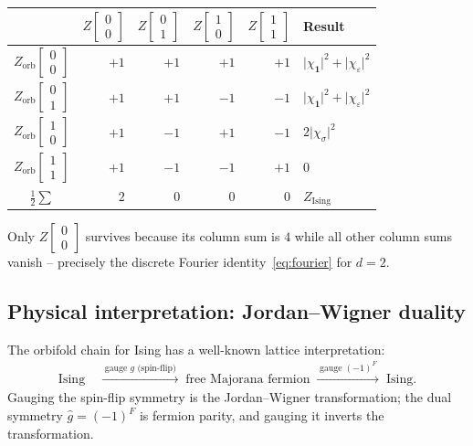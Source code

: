 \documentclass[11pt,a4paper]{article}
\theoremstyle{plain}
\theoremstyle{definition}
\theoremstyle{remark}
\newcommand{\partfn}[2]{Z\!\begin{bmatrix}#1\\#2\end{bmatrix}}
\newcommand{\abs}[1]{\lvert #1 \rvert}
\begin{document}
\medskip
\begin{center}
\renewcommand{\arraystretch}{1.5}
\begin{tabular}{c|rrrr|l}
  \toprule
  & $\partfn{0}{0}$ & $\partfn{0}{1}$ & $\partfn{1}{0}$ & $\partfn{1}{1}$
  & Result \\
  \midrule
  $Z_{\mathrm{orb}}\!\begin{bmatrix}0\\0\end{bmatrix}$
  & $+1$ & $+1$ & $+1$ & $+1$ & $\abs{\chi_{\mathbf{1}}}^2+\abs{\chi_\varepsilon}^2$ \\
  $Z_{\mathrm{orb}}\!\begin{bmatrix}0\\1\end{bmatrix}$
  & $+1$ & $+1$ & $-1$ & $-1$ & $\abs{\chi_{\mathbf{1}}}^2+\abs{\chi_\varepsilon}^2$ \\
  $Z_{\mathrm{orb}}\!\begin{bmatrix}1\\0\end{bmatrix}$
  & $+1$ & $-1$ & $+1$ & $-1$ & $2\abs{\chi_\sigma}^2$ \\
  $Z_{\mathrm{orb}}\!\begin{bmatrix}1\\1\end{bmatrix}$
  & $+1$ & $-1$ & $-1$ & $+1$ & $0$ \\
  \midrule
  $\frac{1}{2}\sum$ & $2$ & $0$ & $0$ & $0$
  & $Z_{\mathrm{Ising}}$ \\
  \bottomrule
\end{tabular}
\end{center}
\medskip

Only $\partfn{0}{0}$ survives because its column sum is $4$ while all
other column sums vanish -- precisely the discrete Fourier
identity~\eqref{eq:fourier} for $d=2$.

\subsection{Physical interpretation: Jordan--Wigner duality}

The orbifold chain for Ising has a well-known lattice interpretation:
\begin{align*}
  \mathrm{Ising}
  &\;\xrightarrow{\;\text{gauge }g\text{ (spin-flip)}\;}\;
  \text{free Majorana fermion}
  \;\xrightarrow{\;\text{gauge }(-1)^F\;}\;
  \mathrm{Ising}.
\end{align*}
Gauging the spin-flip symmetry is the Jordan--Wigner transformation;
the dual symmetry $\hat{g}=(-1)^F$ is fermion parity, and gauging it
inverts the transformation.
\end{document}
